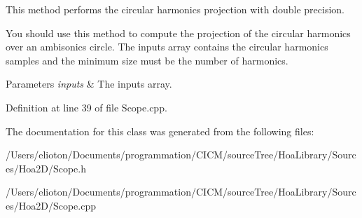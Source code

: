 This method performs the circular harmonics projection with double precision. 

You should use this method to compute the projection of the circular harmonics over an ambisonics circle. The inputs array contains the circular harmonics samples and the minimum size must be the number of harmonics.


\begin{DoxyParams}{Parameters}
{\em inputs} & The inputs array. \\
\hline
\end{DoxyParams}


Definition at line 39 of file Scope.\-cpp.



The documentation for this class was generated from the following files\-:\begin{DoxyCompactItemize}
\item 
/\-Users/elioton/\-Documents/programmation/\-C\-I\-C\-M/source\-Tree/\-Hoa\-Library/\-Sources/\-Hoa2\-D/Scope.\-h\item 
/\-Users/elioton/\-Documents/programmation/\-C\-I\-C\-M/source\-Tree/\-Hoa\-Library/\-Sources/\-Hoa2\-D/Scope.\-cpp\end{DoxyCompactItemize}
